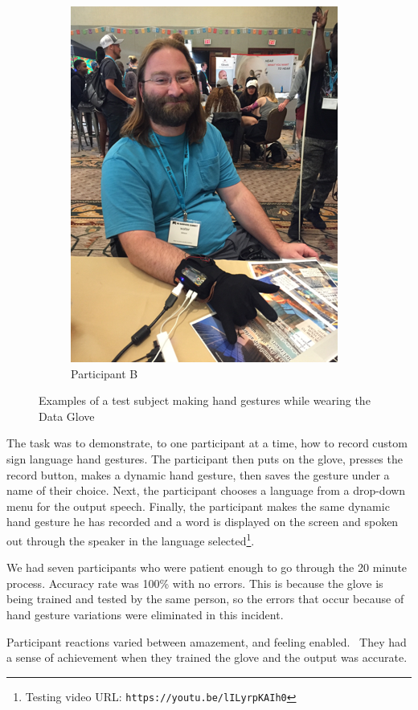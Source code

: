 \begin{figure}
\begin{subfigure}{.4\linewidth}
        \includegraphics{./assets/img/ParticipantB}
        \caption{Participant B}
        \label{fig:participantb}
    \end{subfigure}
    \caption{Examples of a test subject making hand gestures while wearing the Data Glove}
    \label{fig:participants}
\end{figure}

The task was to demonstrate, to one participant at a time, how to record custom sign language hand gestures. The participant then puts on the glove, presses the record button, makes a dynamic hand gesture, then saves the gesture under a name of their choice. Next, the participant chooses a language from a drop-down menu for the output speech. Finally, the participant makes the same dynamic hand gesture he has recorded and a word is displayed on the screen and spoken out through the speaker in the language selected\footnote{Testing video URL: \texttt{https://youtu.be/lILyrpKAIh0}}. 

We had seven participants who were patient enough to go through the 20 minute process. Accuracy rate was 100\% with no errors. This is because the glove is being trained and tested by the same person, so the errors that occur because of hand gesture variations were eliminated in this incident.  

Participant reactions varied between amazement, and feeling enabled.  They had a sense of achievement when they trained the glove and the output was accurate. 

